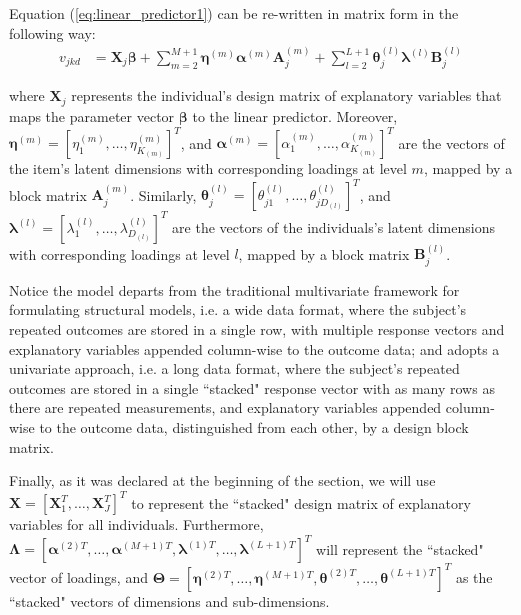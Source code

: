 Equation (\ref{eq:linear_predictor1}) can be re-written in matrix form in the following way:
\begin{equation} \label{eq:linear_predictor2}
	\begin{split}
		v_{jkd} &= \mathbf{X}_{j} \pmb{\beta} + \sum_{m=2}^{M+1} \pmb{\eta}^{(m)} \pmb{\alpha}^{(m)} \mathbf{A}_{j}^{(m)} + \sum_{l=2}^{L+1} \pmb{\theta}_{j}^{(l)} \pmb{\lambda}^{(l)} \mathbf{B}_{j}^{(l)}
	\end{split}
\end{equation}

\noindent where $\mathbf{X}_{j}$ represents the individual's design matrix of explanatory variables that maps the parameter vector $\pmb{\beta}$ to the linear predictor. Moreover, $\pmb{\eta}^{(m)} = [ \eta_{1}^{(m)}, \dots, \eta_{K_{(m)}}^{(m)} ]^{T}$, and  $\pmb{\alpha}^{(m)} = [ \alpha_{1}^{(m)}, \dots, \alpha_{K_{(m)}}^{(m)} ]^{T}$ are the vectors of the item's latent dimensions with corresponding loadings at level $m$, mapped by a block matrix $\mathbf{A}_{j}^{(m)}$. Similarly, $\pmb{\theta}_{j}^{(l)} = [ \theta_{j1}^{(l)}, \dots, \theta_{jD_{(l)}}^{(l)} ]^{T}$, and  $\pmb{\lambda}^{(l)} = [ \lambda_{1}^{(l)}, \dots, \lambda_{D_{(l)}}^{(l)} ]^{T}$ are the vectors of the individuals's latent dimensions with corresponding loadings at level $l$, mapped by a block matrix $\mathbf{B}_{j}^{(l)}$.

Notice the model departs from the traditional multivariate framework for formulating structural models, i.e. a wide data format, where the subject’s repeated outcomes are stored in a single row, with multiple response vectors and explanatory variables appended column-wise to the outcome data; and adopts a univariate approach, i.e. a long data format, where the subject’s repeated outcomes are stored in a single ``stacked" response vector with as many rows as there are repeated measurements, and explanatory variables appended column-wise to the outcome data, distinguished from each other, by a design block matrix. 

Finally, as it was declared at the beginning of the section, we will use $\mathbf{X} = [ \mathbf{X}_{1}^{T}, \dots, \mathbf{X}_{J}^{T} ]^{T}$ to represent the ``stacked" design matrix of explanatory variables for all individuals. Furthermore, $\pmb{\Lambda} = [ \pmb{\alpha}^{(2)T}, \dots, \pmb{\alpha}^{(M+1)T}, \pmb{\lambda}^{(1)T}, \dots, \pmb{\lambda}^{(L+1)T} ]^{T}$ will represent the ``stacked" vector of loadings, and $\pmb{\Theta} = [ \pmb{\eta}^{(2)T}, \dots, \pmb{\eta}^{(M+1)T}, \pmb{\theta}^{(2)T}, \dots, \pmb{\theta}^{(L+1)T} ]^{T}$ as the ``stacked" vectors of dimensions and sub-dimensions.



